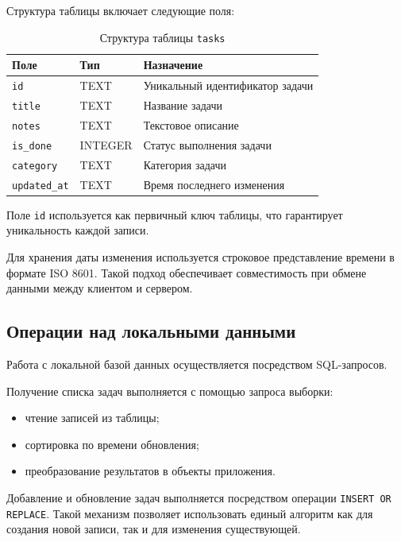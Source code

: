 \documentclass[14pt,a4paper]{extarticle}
\begin{document}
Структура таблицы включает следующие поля:

\begin{table}[H]
\centering
\caption{Структура таблицы \texttt{tasks}}
\label{table:sqlite_tasks}
\begin{tabular}{|p{4cm}|p{3cm}|p{6cm}|}
\hline
\textbf{Поле} & \textbf{Тип} & \textbf{Назначение} \\
\hline
\texttt{id} & TEXT & Уникальный идентификатор задачи \\
\hline
\texttt{title} & TEXT & Название задачи \\
\hline
\texttt{notes} & TEXT & Текстовое описание \\
\hline
\texttt{is\_done} & INTEGER & Статус выполнения задачи \\
\hline
\texttt{category} & TEXT & Категория задачи \\
\hline
\texttt{updated\_at} & TEXT & Время последнего изменения \\
\hline
\end{tabular}
\end{table}

Поле \texttt{id} используется как первичный ключ таблицы, что гарантирует уникальность каждой записи.

Для хранения даты изменения используется строковое представление времени в формате ISO 8601. Такой подход обеспечивает совместимость при обмене данными между клиентом и сервером.

\subsection{Операции над локальными данными}

Работа с локальной базой данных осуществляется посредством SQL-запросов.

Получение списка задач выполняется с помощью запроса выборки:

\begin{itemize}
    \item чтение записей из таблицы;
    \item сортировка по времени обновления;
    \item преобразование результатов в объекты приложения.
\end{itemize}

Добавление и обновление задач выполняется посредством операции \texttt{INSERT OR REPLACE}. Такой механизм позволяет использовать единый алгоритм как для создания новой записи, так и для изменения существующей.
\end{document}
